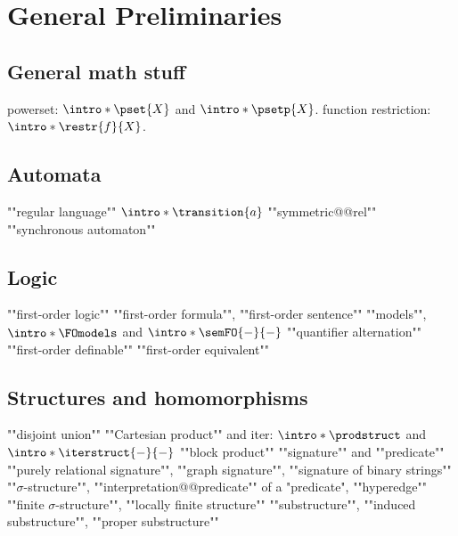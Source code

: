 \chapter{General Preliminaries}

\section{General math stuff}

\begin{itemize}
	\itemAP powerset: $\intro*\pset{X}$ and $\intro*\psetp{X}$.
	\itemAP function restriction: $\intro*\restr{f}{X}$.
\end{itemize}

\section{Automata}

\begin{itemize}
	\itemAP ""regular language""
	\itemAP $\intro*\transition{a}$
	\itemAP ""symmetric@@rel""
	\itemAP ""synchronous automaton""
\end{itemize}

\section{Logic}

\begin{itemize}
	\itemAP ""first-order logic""
	\itemAP ""first-order formula"", ""first-order sentence""
	\itemAP ""models"", $\intro*\FOmodels$ and $\intro*\semFO{-}{-}$
	\itemAP ""quantifier alternation""
	\itemAP ""first-order definable""
	\itemAP ""first-order equivalent""
\end{itemize}

\section{Structures and homomorphisms}

\begin{itemize}
	\itemAP ""disjoint union""
	\itemAP ""Cartesian product"" and iter: $\intro*\prodstruct$ and $\intro*\iterstruct{-}{-}$
	\itemAP ""block product""
	\itemAP ""signature"" and ""predicate""
	\itemAP ""purely relational signature"", ""graph signature"", ""signature of binary strings""
	\itemAP ""$\sigma$-structure"", ""interpretation@@predicate"" of a "predicate", ""hyperedge""
	\itemAP ""finite $\sigma$-structure"", ""locally finite structure""
	\itemAP ""substructure"", ""induced substructure"", ""proper substructure""
\end{itemize}

